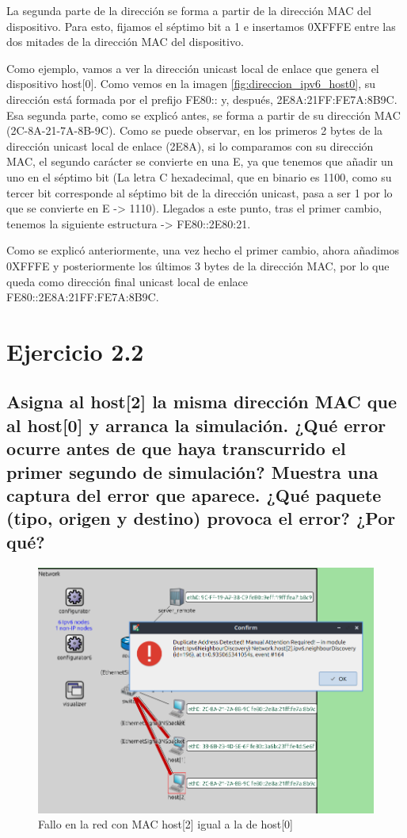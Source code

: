 La segunda parte de la dirección se forma a partir de la dirección MAC del dispositivo. Para esto, fijamos el séptimo bit a 1 e insertamos 0XFFFE entre las dos mitades de la dirección MAC del dispositivo. 

Como ejemplo, vamos a ver la dirección unicast local de enlace que genera el dispositivo host[0]. Como vemos en la imagen \ref{fig:direccion_ipv6_host0}, su dirección está formada por el prefijo FE80:: y, después, 2E8A:21FF:FE7A:8B9C. Esa segunda parte, como se explicó antes, se forma a partir de su dirección MAC (2C-8A-21-7A-8B-9C). Como se puede observar, en los primeros 2 bytes de la dirección unicast local de enlace (2E8A), si lo comparamos con su dirección MAC, el segundo carácter se convierte en una E, ya que tenemos que añadir un uno en el séptimo bit (La letra C hexadecimal, que en binario es 1100, como su tercer bit corresponde al séptimo bit de la dirección unicast, pasa a ser 1 por lo que se convierte en E -> 1110). Llegados a este punto, tras el primer cambio, tenemos la siguiente estructura -> FE80::2E80:21.

Como se explicó anteriormente, una vez hecho el primer cambio, ahora añadimos 0XFFFE  y posteriormente los últimos 3 bytes de la dirección MAC, por lo que queda como dirección final unicast local de enlace\\ FE80::2E8A:21FF:FE7A:8B9C.


\section{Ejercicio 2.2}\label{chap:ejer22}
\subsection{Asigna al host[2] la misma dirección MAC que al host[0] y arranca la simulación. ¿Qué error ocurre antes de
que haya transcurrido el primer segundo de simulación? Muestra una captura del error que aparece. ¿Qué
paquete (tipo, origen y destino) provoca el error? ¿Por qué?}

\begin{figure}[!ht]
    \centering
    \includegraphics[width=135mm, scale=0.75]{imaxes/captura_ejer2_2.png}
    \caption{Fallo en la red con MAC host[2] igual a la de host[0]}
    \label{fig:fallo_ipv6_host2}
\end{figure}

